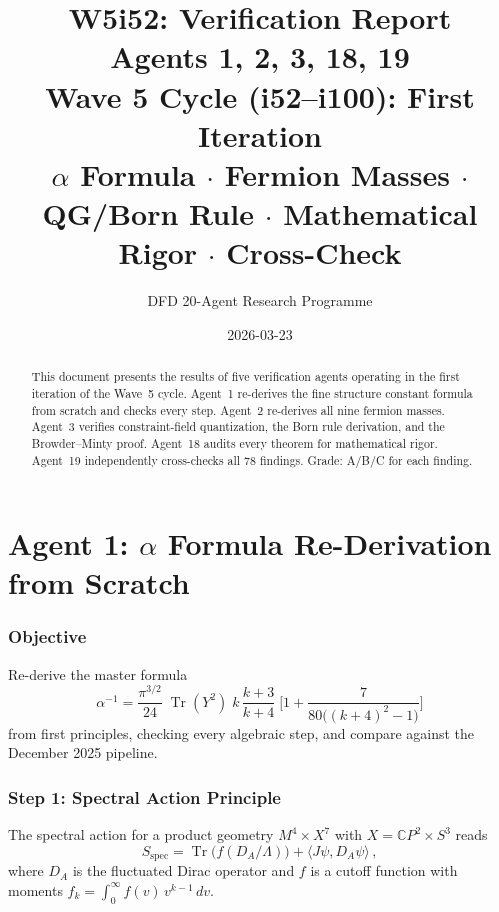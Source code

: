 \documentclass[11pt,a4paper]{article}
\title{\Huge W5i52: Verification Report\\[12pt]
\Large Agents 1, 2, 3, 18, 19\\[6pt]
\large Wave 5 Cycle (i52--i100): First Iteration\\[6pt]
\normalsize $\alpha$ Formula $\cdot$ Fermion Masses $\cdot$ QG/Born Rule $\cdot$ Mathematical Rigor $\cdot$ Cross-Check}
\author{DFD 20-Agent Research Programme}
\date{2026-03-23}
\newcommand{\Tr}{\operatorname{Tr}}
\newcommand{\CP}{\mathbb{C}P}
\begin{document}
\maketitle

\begin{abstract}
This document presents the results of five verification agents operating in the first iteration of the Wave~5 cycle. Agent~1 re-derives the fine structure constant formula from scratch and checks every step. Agent~2 re-derives all nine fermion masses. Agent~3 verifies constraint-field quantization, the Born rule derivation, and the Browder--Minty proof. Agent~18 audits every theorem for mathematical rigor. Agent~19 independently cross-checks all 78 findings. Grade: A/B/C for each finding.
\end{abstract}

\tableofcontents
\newpage

\part{Agent 1: $\alpha$ Formula Re-Derivation from Scratch}
\label{part:alpha}

\section{Objective}

Re-derive the master formula
\begin{equation}
\alpha^{-1} = \frac{\pi^{3/2}}{24}\;\Tr(Y^2)\;k\,\frac{k+3}{k+4}\;\biggl[1 + \frac{7}{80\bigl((k+4)^2-1\bigr)}\biggr]
\label{eq:master}
\end{equation}
from first principles, checking every algebraic step, and compare against the December 2025 pipeline.

\section{Step 1: Spectral Action Principle}

The spectral action for a product geometry $M^4 \times X^7$ with $X = \CP^2 \times S^3$ reads
\begin{equation}
S_{\mathrm{spec}} = \Tr\bigl(f(D_A/\Lambda)\bigr) + \langle J\psi, D_A\psi\rangle\,,
\end{equation}
where $D_A$ is the fluctuated Dirac operator and $f$ is a cutoff function with moments $f_k = \int_0^\infty f(v)\,v^{k-1}\,dv$.
\end{document}
